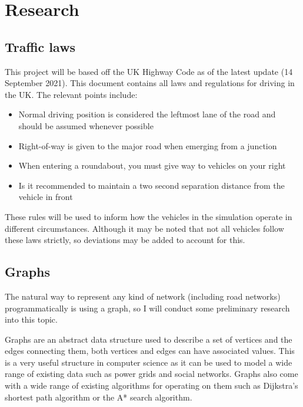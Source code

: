 \section{Research}

    \subsection{Traffic laws}

        This project will be based off the UK Highway Code \cite{Highway-Code} as of the latest update (14 September 2021). This document contains all laws and regulations for driving in the UK. The relevant points include:

        \begin{itemize}
            \item Normal driving position is considered the leftmost lane of the road and should be assumed whenever possible
            \item Right-of-way is given to the major road when emerging from a junction
            \item When entering a roundabout, you must give way to vehicles on your right
            \item Is it recommended to maintain a two second separation distance from the vehicle in front
        \end{itemize}

        These rules will be used to inform how the vehicles in the simulation operate in different circumstances. Although it may be noted that not all vehicles follow these laws strictly, so deviations may be added to account for this.

    \subsection{Graphs}
    \label{max-flow}

        The natural way to represent any kind of network (including road networks) programmatically is using a graph, so I will conduct some preliminary research into this topic.

        Graphs are an abstract data structure used to describe a set of vertices and the edges connecting them, both vertices and edges can have associated values. This is a very useful structure in computer science as it can be used to model a wide range of existing data such as power grids and social networks. Graphs also come with a wide range of existing algorithms for operating on them such as Dijkstra's shortest path algorithm or the A* search algorithm.

